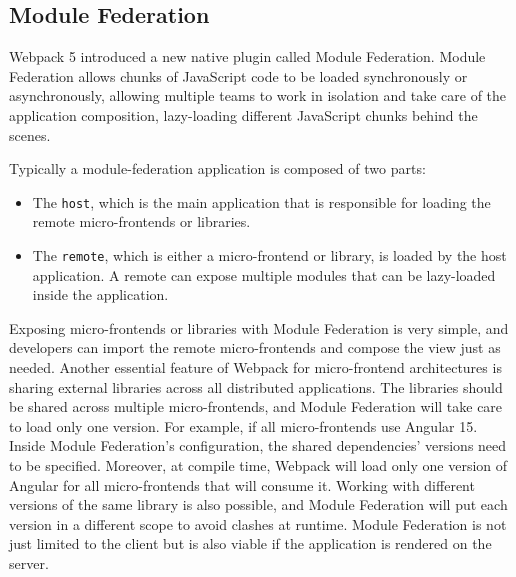 \subsection{Module Federation}\label{subsection:background:micro-frontend:module-federation}

Webpack 5 introduced a new native plugin called Module Federation. Module Federation allows chunks of JavaScript code to be loaded synchronously or asynchronously, allowing multiple teams to work in isolation and take care of the application composition, lazy-loading different JavaScript chunks behind the scenes. \cite[81]{book:2021:mezzalira:applied-methods:building-micro-frontends}

\bigskip

\noindent Typically a module-federation application is composed of two parts: \cite[81]{book:2021:mezzalira:applied-methods:building-micro-frontends}

\begin{itemize}
    \item The \texttt{host}, which is the main application that is responsible for loading the remote micro-frontends or libraries.
    \item The \texttt{remote}, which is either a micro-frontend or library, is loaded by the host application. A remote can expose multiple modules that can be lazy-loaded inside the application.
\end{itemize}

\noindent Exposing micro-frontends or libraries with Module Federation is very simple, and developers can import the remote micro-frontends and compose the view just as needed. Another essential feature of Webpack for micro-frontend architectures is sharing external libraries across all distributed applications. The libraries should be shared across multiple micro-frontends, and Module Federation will take care to load only one version. For example, if all micro-frontends use Angular 15. Inside Module Federation's configuration, the shared dependencies' versions need to be specified.
\noindent Moreover, at compile time, Webpack will load only one version of Angular for all micro-frontends that will consume it. Working with different versions of the same library is also possible, and Module Federation will put each version in a different scope to avoid clashes at runtime. Module Federation is not just limited to the client but is also viable if the application is rendered on the server. \cite[82-83]{book:2021:mezzalira:applied-methods:building-micro-frontends}

